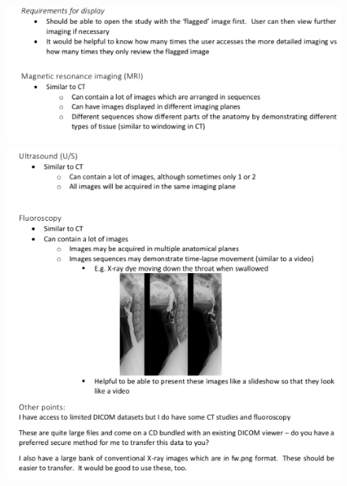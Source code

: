 \begin{figure}[ht]
\centering
\includegraphics[width = 0.95\hsize]{./figures/ImagingSpec3}
\includegraphics[width = 0.95\hsize]{./figures/ImagingSpec4}
\end{figure}
\clearpage
